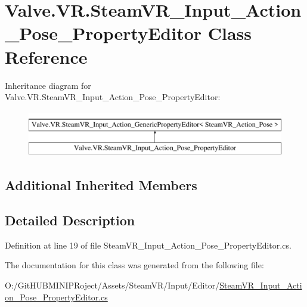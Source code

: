 \hypertarget{class_valve_1_1_v_r_1_1_steam_v_r___input___action___pose___property_editor}{}\section{Valve.\+V\+R.\+Steam\+V\+R\+\_\+\+Input\+\_\+\+Action\+\_\+\+Pose\+\_\+\+Property\+Editor Class Reference}
\label{class_valve_1_1_v_r_1_1_steam_v_r___input___action___pose___property_editor}
Inheritance diagram for Valve.\+V\+R.\+Steam\+V\+R\+\_\+\+Input\+\_\+\+Action\+\_\+\+Pose\+\_\+\+Property\+Editor\+:\begin{figure}[H]
\begin{center}
\leavevmode
\includegraphics[height=2.000000cm]{class_valve_1_1_v_r_1_1_steam_v_r___input___action___pose___property_editor}
\end{center}
\end{figure}
\subsection*{Additional Inherited Members}


\subsection{Detailed Description}


Definition at line 19 of file Steam\+V\+R\+\_\+\+Input\+\_\+\+Action\+\_\+\+Pose\+\_\+\+Property\+Editor.\+cs.



The documentation for this class was generated from the following file\+:\begin{DoxyCompactItemize}
\item 
O\+:/\+Git\+H\+U\+B\+M\+I\+N\+I\+P\+Roject/\+Assets/\+Steam\+V\+R/\+Input/\+Editor/\mbox{\hyperlink{_steam_v_r___input___action___pose___property_editor_8cs}{Steam\+V\+R\+\_\+\+Input\+\_\+\+Action\+\_\+\+Pose\+\_\+\+Property\+Editor.\+cs}}\end{DoxyCompactItemize}
